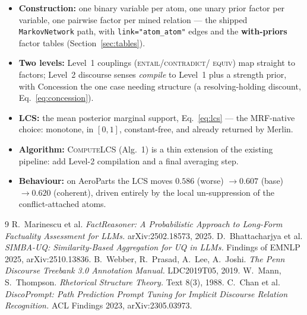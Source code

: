 \documentclass[11pt]{article}
\begin{document}
\begin{itemize}[leftmargin=*]
  \item \textbf{Construction:} one binary variable per atom, one unary prior factor per
        variable, one pairwise factor per mined relation --- the shipped
        \texttt{MarkovNetwork} path, with \texttt{link="atom\_atom"} edges and the
        \textbf{with-priors} factor tables (Section~\ref{sec:tables}).
  \item \textbf{Two levels:} Level~1 couplings (\textsc{entail}/\textsc{contradict}/%
        \textsc{equiv}) map straight to factors; Level~2 discourse senses \emph{compile}
        to Level~1 plus a strength prior, with Concession the one case needing structure
        (a resolving-holding discount, Eq.~\eqref{eq:concession}).
  \item \textbf{LCS:} the mean posterior marginal support, Eq.~\eqref{eq:lcs} --- the
        MRF-native choice: monotone, in $[0,1]$, constant-free, and already returned by
        Merlin.
  \item \textbf{Algorithm:} \textsc{ComputeLCS} (Alg.~1) is a thin extension of the existing
        pipeline: add Level-2 compilation and a final averaging step.
  \item \textbf{Behaviour:} on AeroParts the LCS moves $0.586$ (worse) $\to 0.607$ (base)
        $\to 0.620$ (coherent), driven entirely by the local un-suppression of the
        conflict-attached atoms.
\end{itemize}

\begin{thebibliography}{9}\small
{} R.~Marinescu et al.
  \emph{FactReasoner: A Probabilistic Approach to Long-Form Factuality Assessment for LLMs.}
  arXiv:2502.18573, 2025.
 D.~Bhattacharjya et al.
  \emph{SIMBA-UQ: Similarity-Based Aggregation for UQ in LLMs.} Findings of EMNLP 2025,
  arXiv:2510.13836.
 B.~Webber, R.~Prasad, A.~Lee, A.~Joshi.
  \emph{The Penn Discourse Treebank 3.0 Annotation Manual.} LDC2019T05, 2019.
 W.~Mann, S.~Thompson. \emph{Rhetorical Structure Theory.} Text 8(3), 1988.
 C.~Chan et al.
  \emph{DiscoPrompt: Path Prediction Prompt Tuning for Implicit Discourse Relation
  Recognition.} ACL Findings 2023, arXiv:2305.03973.
\end{thebibliography}
\end{document}
